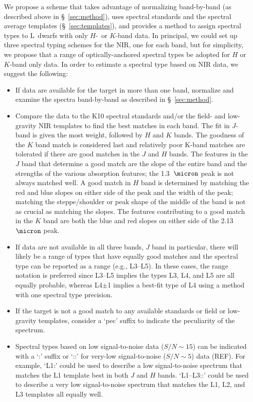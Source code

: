 \documentclass[12pt,preprint]{aastex}
\begin{document}
We propose a scheme that takes advantage of normalizing band-by-band (as described above in \S~\ref{sec:method}), uses spectral standards and the spectral average templates (\S~\ref{sec:templates}), and provides a method to assign spectral types to L~dwarfs with only $H$-~or $K$-band data. 
In principal, we could set up three spectral typing schemes for the NIR, one for each band, but for simplicity, we propose that a range of optically-anchored spectral types be adopted for $H$ or $K$-band only data.
In order to estimate a spectral type based on NIR data, we suggest the following:
\begin{itemize}
	\item If data are available for the target in more than one band, normalize and examine the spectra band-by-band as described in \S~\ref{sec:method}.
	\item Compare the data to the K10 spectral standards and/or the field- and low-gravity NIR templates to find the best matches in each band. 
	The fit in $J$-band is given the most weight, followed by $H$ and $K$ bands. The goodness of the $K$ band match is considered last and relatively poor K-band matches are tolerated if there are good matches in the $J$ and $H$ bands. 
	The features in the $J$ band that determine a good match are the slope of the entire band and the strengths of the various absorption features; the 1.3~$\micron$ peak is not always matched well. 
	A good match in $H$ band is determined by matching the red and blue slopes on either side of the peak and the width of the peak; matching the steppe/shoulder or peak shape of the middle of the band is not as crucial as matching the slopes. 
The features contributing to a good match in the $K$ band are both the blue and red slopes on either side of the 2.13~$\micron$ peak.	
	\item If data are not available in all three bands, $J$ band in particular, there will likely be a range of types that have equally good matches and the spectral type can be reported as a range (e.g., L3--L5). In these cases, the range notation is preferred since L3--L5 implies the types L3, L4, and L5 are all equally probable, whereas L4$\pm$1 implies a best-fit type of L4 using a method with one spectral type precision.
	\item If the target is not a good match to any available standards or field or low-gravity templates, consider a `pec' suffix to indicate the peculiarity of the spectrum.
	\item Spectral types based on low signal-to-noise data ($S/N\sim15$) can be indicated with a `:' suffix or `::' for very-low signal-to-noise ($S/N\sim5$) data (REF). For example, `L1:' could be used to describe a low signal-to-noise spectrum that matches the L1 template best in both $J$ and $H$ bands. `L1--L3::' could be used to describe a very low signal-to-noise spectrum that matches the L1, L2, and L3 templates all equally well.
\end{itemize}	
\end{document}
